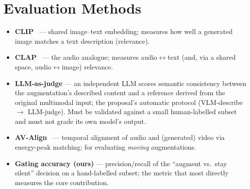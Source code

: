 \documentclass[11pt,a4paper]{article}
\begin{document}
\section{Evaluation Methods}
\begin{itemize}
  \item \textbf{CLIP}~\cite{clip} --- shared image--text embedding; measures how well a generated image
    matches a text description (relevance).
  \item \textbf{CLAP}~\cite{clap} --- the audio analogue; measures audio$\leftrightarrow$text (and,
    via a shared space, audio$\leftrightarrow$image) relevance.
  \item \textbf{LLM-as-judge} --- an independent LLM scores semantic consistency between the
    augmentation's described content and a reference derived from the original multimodal input; the
    proposal's automatic protocol (VLM-describe $\rightarrow$ LLM-judge). Must be validated against a
    small human-labelled subset and must not grade its own model's output.
  \item \textbf{AV-Align}~\cite{tempotokens} --- temporal alignment of audio and (generated) video via
    energy-peak matching; for evaluating \emph{moving} augmentations.
  \item \textbf{Gating accuracy (ours)} --- precision/recall of the ``augment vs.\ stay silent''
    decision on a hand-labelled subset; the metric that most directly measures the core contribution.
\end{itemize}

\end{document}
